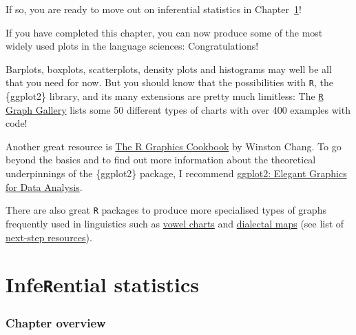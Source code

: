 \documentclass[
  letterpaper,
  DIV=11,
  numbers=noendperiod]{scrreprt}
\begin{document}
If so, you are ready to move out on inferential statistics in
Chapter~\ref{sec-Inferential}!

\begin{tcolorbox}[enhanced jigsaw, arc=.35mm, bottomrule=.15mm, bottomtitle=1mm, breakable, colback=white, colbacktitle=quarto-callout-note-color!10!white, colframe=quarto-callout-note-color-frame, coltitle=black, left=2mm, leftrule=.75mm, opacityback=0, opacitybacktitle=0.6, rightrule=.15mm, title=\textcolor{quarto-callout-note-color}{\faInfo}\hspace{0.5em}{Charting your way to success \emoji{compass}}, titlerule=0mm, toprule=.15mm, toptitle=1mm]

If you have completed this chapter, you can now produce some of the most
widely used plots in the language sciences: Congratulations!

Barplots, boxplots, scatterplots, density plots and histograms may well
be all that you need for now. But you should know that the possibilities
with \texttt{R}, the \{ggplot2\} library, and its many extensions are
pretty much limitless: The
\href{https://r-graph-gallery.com/}{\texttt{R} Graph Gallery} lists some
50 different types of charts with over 400 examples with code!

Another great resource is \href{https://r-graphics.org}{The R Graphics
Cookbook} by Winston Chang. To go beyond the basics and to find out more
information about the theoretical underpinnings of the \{ggplot2\}
package, I recommend \href{https://ggplot2-book.org}{ggplot2: Elegant
Graphics for Data Analysis}.

There are also great \texttt{R} packages to produce more specialised
types of graphs frequently used in linguistics such as
\href{https://joeystanley.com/blog/making-vowel-plots-in-r-part-1/}{vowel
charts} and \href{https://doi.org/10.1017/jlg.2024.11}{dialectal maps}
(see list of
\href{https://elenlefoll.github.io/RstatsTextbook/A_FurtherResources.html}{next-step
resources}).

\end{tcolorbox}


\chapter{\texorpdfstring{Infe\texttt{R}ential
statistics}{InfeRential statistics}}\label{sec-Inferential}

\subsection*{Chapter overview}\label{chapter-overview-10}
\end{document}
